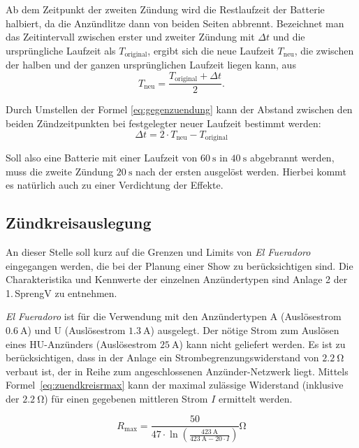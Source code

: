 \documentclass[paper=a4, parskip, numbers=noenddot, toc=listof, headsepline]{scrbook}
\newcommand{\anlage}{\emph{El Fueradoro}}
\begin{document}
					Ab dem Zeitpunkt der zweiten Zündung wird die Restlaufzeit der Batterie halbiert, da die Anzündlitze dann von beiden Seiten abbrennt. Bezeichnet man das Zeitintervall zwischen erster und zweiter Zündung mit ${\Delta}t$ und die ursprüngliche Laufzeit als $T_\text{original}$, ergibt sich die neue Laufzeit $T_\text{neu}$, die zwischen der halben und der ganzen ursprünglichen Laufzeit liegen kann, aus
					\begin{equation}
						T_\text{neu} = \frac{T_\text{original} + {\Delta}t}{2}.
						\label{eq:gegenzuendung}
					\end{equation}

					Durch Umstellen der Formel \eqref{eq:gegenzuendung} kann der Abstand zwischen den beiden Zündzeitpunkten bei festgelegter neuer Laufzeit bestimmt werden:
					\begin{equation}
						{\Delta}t = 2 {\cdot} T_\text{neu} - T_\text{original}
					\end{equation}

					Soll also eine Batterie mit einer Laufzeit von $\SI{60}{\second}$ in $\SI{40}{\second}$ abgebrannt werden, muss die zweite Zündung $\SI{20}{\second}$ nach der ersten ausgelöst werden. Hierbei kommt es natürlich auch zu einer Verdichtung der Effekte.

				\subsection{Zündkreisauslegung}

					An dieser Stelle soll kurz auf die Grenzen und Limits von {\anlage} eingegangen werden, die bei der Planung einer Show zu berücksichtigen sind. Die Charakteristika und Kennwerte der einzelnen Anzündertypen sind Anlage 2 der 1.\,SprengV zu entnehmen.

					{\anlage} ist für die Verwendung mit den Anzündertypen A (Auslösestrom $\SI{0,6}{\ampere}$) und U (Auslösestrom $\SI{1,3}{\ampere}$) ausgelegt. Der nötige Strom zum Auslösen eines HU-Anzünders (Auslösestrom $\SI{25}{\ampere}$) kann nicht geliefert werden. Es ist zu berücksichtigen, dass in der Anlage ein Strombegrenzungswiderstand von $\SI{2,2}{\ohm}$ verbaut ist, der in Reihe zum angeschlossenen Anzünder-Netzwerk liegt. Mittels Formel~\eqref{eq:zuendkreisrmax} kann der maximal zulässige Widerstand (inklusive der $\SI{2,2}{\ohm}$) für einen gegebenen mittleren Strom $I$ ermittelt werden.

					\begin{equation}
						R_\text{max} = \frac{50}{47 {\cdot} \ln\left(\frac{\SI{423}{\ampere}}{\SI{423}{\ampere} - 20 {\cdot} I}\right)}\si{\ohm}
						\label{eq:zuendkreisrmax}
					\end{equation}
\end{document}
